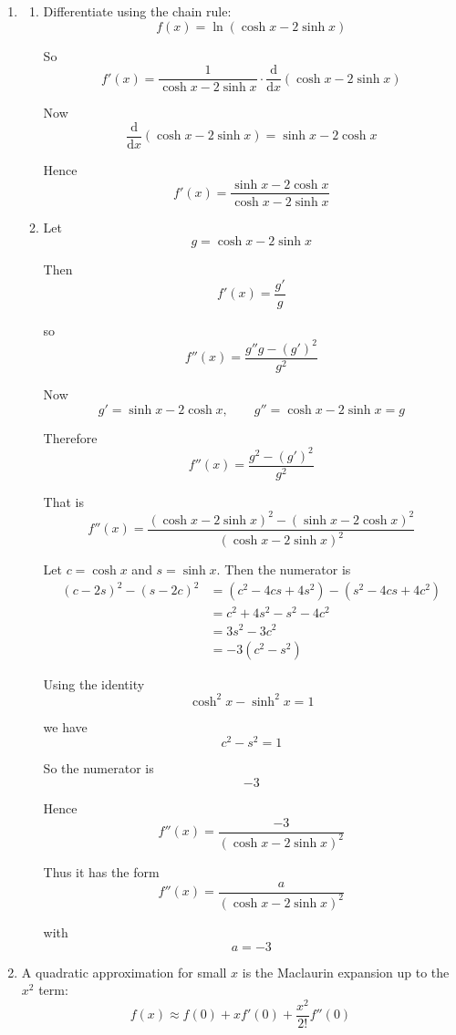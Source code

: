 \documentclass[leqno]{article}
\begin{document}
\begin{enumerate}[
  label=\textbf{\arabic*.},
  leftmargin=*,
  topsep=0pt,
  partopsep=0pt,
  parsep=0pt
]
\begin{djsSolution}
\begin{enumerate}[label=\textbf{(\alph*)}]
Since $2e^k>0$, we need
\[
3-e^{2k}>0
\]

So
\[
e^{2k}<3
\]

Taking natural logarithms:
\[
2k<\ln 3
\]

Hence
\[
k<\frac{1}{2}\ln 3
\]

  \item \begin{enumerate}[label=(\roman*)]
    \item Differentiate using the chain rule:
\[
f(x)=\ln(\cosh x-2\sinh x)
\]

So
\[
f'(x)=\frac{1}{\cosh x-2\sinh x}\cdot \frac{\mathrm{d}}{\mathrm{d}x}(\cosh x-2\sinh x)
\]

Now
\[
\frac{\mathrm{d}}{\mathrm{d}x}(\cosh x-2\sinh x)=\sinh x-2\cosh x
\]

Hence
\[
f'(x)=\frac{\sinh x-2\cosh x}{\cosh x-2\sinh x}
\]

    \item Let
\[
g=\cosh x-2\sinh x
\]

Then
\[
f'(x)=\frac{g'}{g}
\]

so
\[
f''(x)=\frac{g''g-(g')^2}{g^2}
\]

Now
\[
g'=\sinh x-2\cosh x, \qquad g''=\cosh x-2\sinh x=g
\]

Therefore
\[
f''(x)=\frac{g^2-(g')^2}{g^2}
\]

That is
\[
f''(x)=\frac{(\cosh x-2\sinh x)^2-(\sinh x-2\cosh x)^2}{(\cosh x-2\sinh x)^2}
\]

Let $c=\cosh x$ and $s=\sinh x$. Then the numerator is
\begin{align*}
(c-2s)^2-(s-2c)^2
&=(c^2-4cs+4s^2)-(s^2-4cs+4c^2) \\
&=c^2+4s^2-s^2-4c^2 \\
&=3s^2-3c^2 \\
&=-3(c^2-s^2)
\end{align*}

Using the identity
\[
\cosh^2 x-\sinh^2 x=1
\]

we have
\[
c^2-s^2=1
\]

So the numerator is
\[
-3
\]

Hence
\[
f''(x)=\frac{-3}{(\cosh x-2\sinh x)^2}
\]

Thus it has the form
\[
f''(x)=\frac{a}{(\cosh x-2\sinh x)^2}
\]

with
\[
a=-3
\]
  \end{enumerate}

  \item A quadratic approximation for small $x$ is the Maclaurin expansion up to the $x^2$ term:
\[
f(x)\approx f(0)+xf'(0)+\frac{x^2}{2!}f''(0)
\]


\end{enumerate}
\end{djsSolution}
\end{enumerate}
\end{document}
